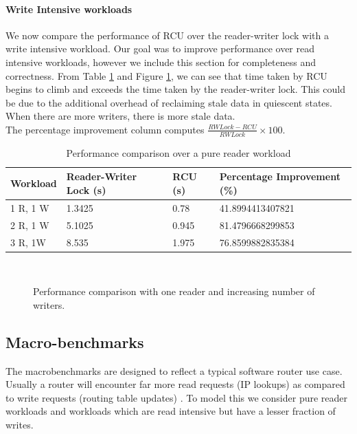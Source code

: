 \documentclass{article}
\begin{document}
\paragraph{Write Intensive workloads}
We now compare the performance of RCU over the reader-writer lock with a write intensive workload. Our goal was to improve performance over read intensive workloads, however we include this section for completeness and correctness. From Table \ref{tbl:writeintensive} and Figure \ref{chart:writeintensive}, we can see that time taken by RCU begins to climb and exceeds the time taken by the reader-writer lock. This could be due to the additional overhead of reclaiming stale data in quiescent states. When there are more writers, there is more stale data. 
\\The percentage improvement column computes $\frac{RWLock - RCU}{RWLock}\times100$.
\begin{table}[tph]
\begin{center}
\begin{tabular}{|l|l|l|l|}
\hline Workload & Reader-Writer Lock (s) & RCU (s) &	Percentage Improvement (\%)\\
\hline 1 R, 1 W	& 1.3425 & 0.78	& 41.8994413407821\\
\hline 2 R, 1 W	& 5.1025 & 0.945 & 81.4796668299853\\
\hline 3 R, 1W & 8.535 & 1.975 & 76.8599882835384\\
\hline
\end{tabular}
\end{center}
\label{tbl:writeintensive}
\caption{Performance comparison over a pure reader workload}
\end{table}
\\
\begin{figure}[tph]
\begin{center}
\caption{Performance comparison with one reader and increasing number of writers.}
\label{chart:writeintensive}
\end{center}
\end{figure}


\subsection{Macro-benchmarks}


The macrobenchmarks are designed to reflect a typical software router
use case. Usually a router will encounter far more read requests (IP
lookups) as compared to write requests (routing table updates) . To
model this we consider pure reader workloads and workloads which are
read intensive but have a lesser fraction of writes.
\end{document}
